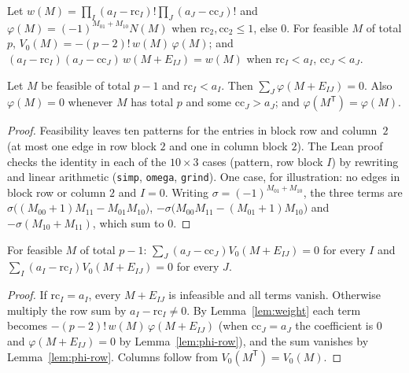 \begin{lemma}\label{lem:weight}
Let $w(M)=\prod_I(a_I-\mathrm{rc}_I)!\prod_J(a_J-\mathrm{cc}_J)!$ and
$\varphi(M)=(-1)^{M_{01}+M_{10}}N(M)$ when $\mathrm{rc}_2,\mathrm{cc}_2\le1$, else $0$.
For feasible $M$ of total $p$, $V_0(M)=-(p-2)!\,w(M)\,\varphi(M)$; and
$(a_I-\mathrm{rc}_I)(a_J-\mathrm{cc}_J)\,w(M+E_{IJ})=w(M)$ when
$\mathrm{rc}_I<a_I$, $\mathrm{cc}_J<a_J$.
\end{lemma}

\begin{lemma}\label{lem:phi-row}
Let $M$ be feasible of total $p-1$ and $\mathrm{rc}_I<a_I$.  Then
$\sum_J\varphi(M+E_{IJ})=0$.  Also $\varphi(M)=0$ whenever $M$ has total $p$ and some
$\mathrm{cc}_J>a_J$; and $\varphi(M^{\mathsf T})=\varphi(M)$.
\end{lemma}

\begin{proof}
Feasibility leaves ten patterns for the entries in block row and column~$2$
(at most one edge in row block $2$ and one in column block $2$).
The Lean proof checks the identity in each of the $10\times3$ cases (pattern, row
block $I$) by rewriting and linear arithmetic (\texttt{simp}, \texttt{omega},
\texttt{grind}).  One case, for illustration: no edges in block row or column $2$
and $I=0$.  Writing $\sigma=(-1)^{M_{01}+M_{10}}$, the three terms are
$\sigma\bigl((M_{00}+1)M_{11}-M_{01}M_{10}\bigr)$,
$-\sigma\bigl(M_{00}M_{11}-(M_{01}+1)M_{10}\bigr)$ and $-\sigma(M_{10}+M_{11})$,
which sum to $0$.
\end{proof}

\begin{proposition}\label{prop:B-harm}
For feasible $M$ of total $p-1$:
$\sum_J(a_J-\mathrm{cc}_J)V_0(M+E_{IJ})=0$ for every $I$ and
$\sum_I(a_I-\mathrm{rc}_I)V_0(M+E_{IJ})=0$ for every $J$.
\end{proposition}

\begin{proof}
If $\mathrm{rc}_I=a_I$, every $M+E_{IJ}$ is infeasible and all terms vanish.
Otherwise multiply the row sum by $a_I-\mathrm{rc}_I\ne0$.  By
Lemma~\ref{lem:weight} each term becomes $-(p-2)!\,w(M)\,\varphi(M+E_{IJ})$ (when
$\mathrm{cc}_J=a_J$ the coefficient is $0$ and $\varphi(M+E_{IJ})=0$ by
Lemma~\ref{lem:phi-row}), and the sum vanishes by Lemma~\ref{lem:phi-row}.  Columns
follow from $V_0(M^{\mathsf T})=V_0(M)$.
\end{proof}

